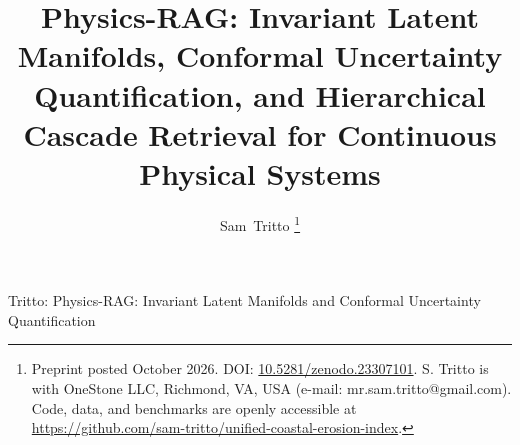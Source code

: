 \documentclass[journal]{IEEEtran}
\begin{document}
\title{Physics-RAG: Invariant Latent Manifolds, Conformal Uncertainty Quantification, and Hierarchical Cascade Retrieval for Continuous Physical Systems}

\author{Sam~Tritto%
\thanks{Preprint posted October 2026. DOI: \href{https://doi.org/10.5281/zenodo.23307101}{10.5281/zenodo.23307101}. S. Tritto is with OneStone LLC, Richmond, VA, USA (e-mail: mr.sam.tritto@gmail.com). Code, data, and benchmarks are openly accessible at \url{https://github.com/sam-tritto/unified-coastal-erosion-index}.}%
}

%
{Tritto: Physics-RAG: Invariant Latent Manifolds and Conformal Uncertainty Quantification}

\maketitle
\end{document}
